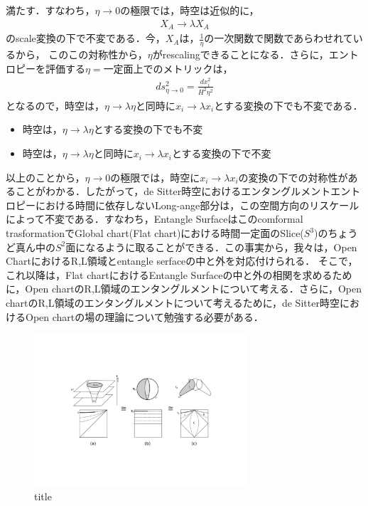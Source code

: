 満たす．すなわち，$\eta\to0$の極限では，時空は近似的に，
\begin{align}
  X_{A}\to\lambda X_{A}
\end{align}
のscale変換の下で不変である．今，$X_{A}$は，$\frac{1}{\eta}$の一次関数で関数であらわせれているから，
このこの対称性から，$\eta$がrescalingできることになる．さらに，エントロピーを評価する$\eta=$一定面上でのメトリックは，
\begin{align}
  ds^2_{\eta\to0}=\frac{dx^2_{i}}{H^2\eta^2}
\end{align}
となるので，時空は，$\eta\to\lambda\eta$と同時に$x_{i}\to\lambda x_{i}$とする変換の下でも不変である．
\begin{itemize}
  \item{時空は，$\eta\to\lambda\eta$とする変換の下でも不変}
  \item{時空は，$\eta\to\lambda\eta$と同時に$x_{i}\to\lambda x_{i}$とする変換の下で不変}
\end{itemize}
以上のことから，$\eta\to0$の極限では，時空に$x_{i}\to\lambda x_{i}$の変換の下での対称性があることがわかる．したがって，de Sitter時空におけるエンタングルメントエントロピーにおける時間に依存しないLong-ange部分は，この空間方向のリスケールによって不変である．すなわち，Entangle Surfaceはこのcomformal trasformationでGlobal chart(Flat chart)における時間一定面のSlice($S^3$)のちょうど真ん中の$S^2$面になるように取ることができる．この事実から，我々は，Open ChartにおけるR,L領域とentangle serfaceの中と外を対応付けられる．
そこで，これ以降は，Flat chartにおけるEntangle Surfaceの中と外の相関を求めるために，Open chartのR,L領域のエンタングルメントについて考える．さらに，Open chartのR,L領域のエンタングルメントについて考えるために，de Sitter時空におけるOpen chartの場の理論について勉強する必要がある．


  \begin{figure}[H]
    \begin{center}
    \includegraphics[width=8cm,angle=270]{de.pdf}
    \caption{title}
    \end{center}
  \end{figure}

